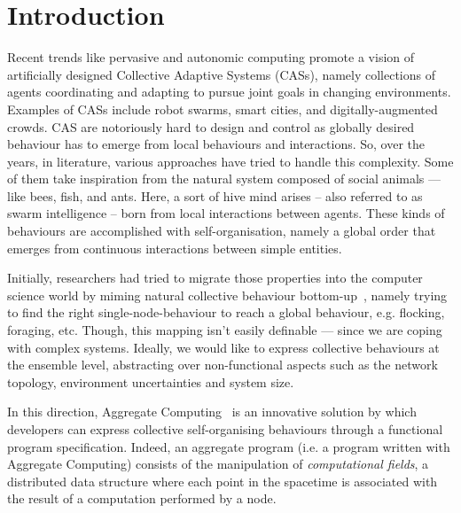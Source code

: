 \documentclass[conference]{IEEEtran}
\begin{document}
\section{Introduction}
Recent trends like pervasive and autonomic computing 
 promote a vision of artificially designed Collective Adaptive Systems (CASs),
 namely collections of agents coordinating and adapting %
 to pursue joint goals in changing environments.
 Examples of CASs include robot swarms, smart cities, and digitally-augmented crowds.
%
%
CAS are notoriously hard to design and control 
 as globally desired behaviour
 has to emerge from local behaviours and interactions. 
So, over the years, in literature, various approaches have tried to handle this complexity. 
%
Some of them take inspiration from the natural system
 composed of social animals --- like bees, fish, and ants. 
%
Here, a sort of hive mind arises -- 
 also referred to as swarm intelligence --  
 born from local interactions between agents. 
%
These kinds of behaviours are accomplished with self-organisation, 
 namely a global order that emerges from continuous 
 interactions between simple entities.

Initially, researchers had tried to migrate those properties into the computer science world 
 by miming natural collective behaviour bottom-up~\cite{DBLP:journals/connection/Webb02}, 
 namely trying to find the right single-node-behaviour 
 to reach a global behaviour, e.g. flocking, foraging, etc.
%
Though, this mapping isn't easily definable ---
 since we are coping with complex systems.
%
Ideally, we would like to express collective behaviours at the ensemble level,
 abstracting over non-functional aspects such as the network topology, environment uncertainties and 
 system size.

In this direction, Aggregate Computing~\cite{DBLP:journals/computer/BealPV15} is an innovative solution by which 
 developers can express collective self-organising behaviours through a functional program specification.
%
Indeed, an aggregate program (i.e. a program written with Aggregate Computing) consists of the manipulation of \textit{computational fields}, a distributed
 data structure where each point in the spacetime is associated with the result of a computation
 performed by a node.
%
\end{document}
